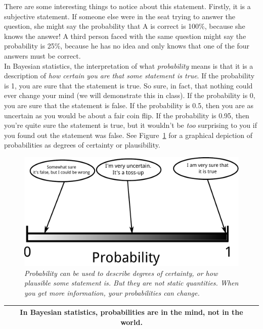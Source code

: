 There are some interesting
things to notice about this statement. Firstly, it is a subjective statement.
If someone else were in the seat trying to answer the question, she might say
the probability that A is correct is 100\%, because she knows the answer!
A third person faced with the same question might say the probability is 25\%,
because he has no idea and only knows that one of the four answers
must be correct.\\

In Bayesian statistics, the interpretation of what {\it probability} means is
that it is a description of {\it how certain you are that some statement is
true}.
If the probability is 1, you are sure that the statement is true. So sure, in
fact, that nothing could ever change your mind (we will demonstrate this in class).
If the probability is 0, you
are sure that the statement is false. If the probability is 0.5, then you
are as uncertain as you would be about a fair coin flip. If the probability is
0.95, then you're quite sure the statement is true, but it wouldn't be {\it too}
surprising to you if you found out the statement was false. See
Figure~\ref{fig:probability_scale} for a graphical depiction of probabilities
as degrees of certainty or plausibility.\\

\begin{figure}
\begin{center}
\includegraphics[scale=0.6]{Figures/probability_scale.pdf}
\caption{\it Probability can be used to describe degrees of certainty, or
how plausible some statement is. But they are not static quantities. When
you get more information, your probabilities can change.
\label{fig:probability_scale}}
\end{center}
\end{figure}

\begin{center}
\begin{tabular}{|c|}
\hline
{\bf In Bayesian statistics, probabilities are in the mind, not in the world.}\\
\hline
\end{tabular}
\end{center}

